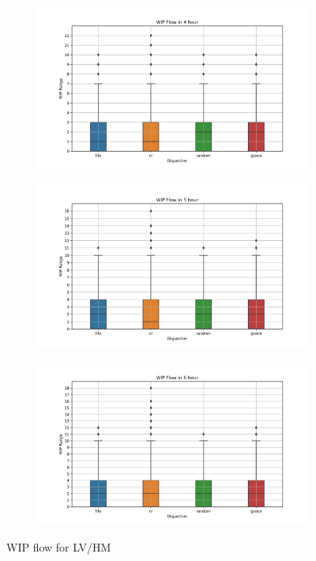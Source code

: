 \begin{figure}[t]
\begin{subfigure}{0.32\textwidth}
	\end{subfigure}
	\begin{subfigure}{0.32\textwidth}
		\includegraphics[width=\textwidth]{LVHM/period_14400s.png}
	\end{subfigure}\hfill
	\begin{subfigure}{0.32\textwidth}
		\includegraphics[width=\textwidth]{LVHM/period_18000s.png}
	\end{subfigure}\hfill
	\begin{subfigure}{0.32\textwidth}
		\includegraphics[width=\textwidth]{LVHM/period_21600s.png}
	\end{subfigure}
    \caption{WIP flow for LV/HM}
    \label{fig:wip-flows-LVHM}
\end{figure}


